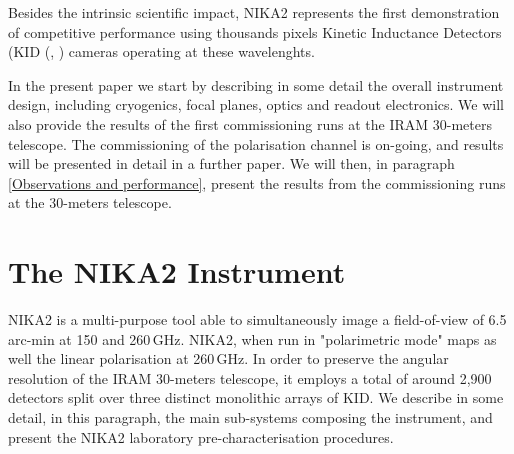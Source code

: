 \documentclass[]{aa} %
\begin{document}

Besides the intrinsic scientific impact, NIKA2 represents the first demonstration of competitive performance using thousands pixels Kinetic Inductance Detectors (KID (\cite{Day2003}, \cite{Doyle2010}) cameras operating at these wavelenghts.

In the present paper we start by describing in some detail the overall instrument design, including cryogenics, focal planes, optics and readout electronics. We will also provide the results of the first commissioning runs at the IRAM 30-meters telescope. The commissioning of the polarisation channel is on-going, and results will be presented in detail in a further paper. We will then, in paragraph \ref{Observations and performance}, present the results from the commissioning runs at the 30-meters telescope. 


\section{The NIKA2 Instrument}

NIKA2 is a multi-purpose tool able to simultaneously image a field-of-view of 6.5\,arc-min at 150 and 260\,GHz. NIKA2, when run in "polarimetric mode"  maps as well the linear polarisation  at 260\,GHz. In order to preserve the angular resolution of the IRAM 30-meters telescope, it employs a total of around 2,900\,detectors split over three distinct monolithic arrays of KID. We describe in some detail, in this paragraph, the main sub-systems composing the instrument, and present the NIKA2 laboratory pre-characterisation procedures.
\end{document}
